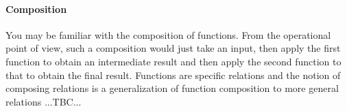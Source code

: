 \paragraph{Composition}
You may be familiar with the composition of functions. From the operational point of view, such a composition would just take an input, then apply the first function to obtain an intermediate result and then apply the second function to that to obtain the final result. Functions are specific relations and the notion of composing relations is a generalization of function composition to more general relations ...TBC...







